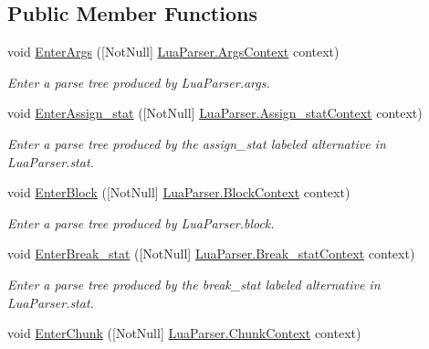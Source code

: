 \subsection*{Public Member Functions}
\begin{DoxyCompactItemize}
\item 
void \mbox{\hyperlink{classzlua_1_1_compiler_a60ee0650123807779b316af7cf7b213d}{Enter\+Args}} (\mbox{[}Not\+Null\mbox{]} \mbox{\hyperlink{classzlua_1_1_lua_parser_1_1_args_context}{Lua\+Parser.\+Args\+Context}} context)
\begin{DoxyCompactList}\small\item\em Enter a parse tree produced by Lua\+Parser.\+args. \end{DoxyCompactList}\item 
void \mbox{\hyperlink{classzlua_1_1_compiler_aaffd1a513f64fae2076a896a889e00bf}{Enter\+Assign\+\_\+stat}} (\mbox{[}Not\+Null\mbox{]} \mbox{\hyperlink{classzlua_1_1_lua_parser_1_1_assign__stat_context}{Lua\+Parser.\+Assign\+\_\+stat\+Context}} context)
\begin{DoxyCompactList}\small\item\em Enter a parse tree produced by the {\ttfamily assign\+\_\+stat} labeled alternative in Lua\+Parser.\+stat. \end{DoxyCompactList}\item 
void \mbox{\hyperlink{classzlua_1_1_compiler_a3bb0ad1158b35844611b3bbb75ff5521}{Enter\+Block}} (\mbox{[}Not\+Null\mbox{]} \mbox{\hyperlink{classzlua_1_1_lua_parser_1_1_block_context}{Lua\+Parser.\+Block\+Context}} context)
\begin{DoxyCompactList}\small\item\em Enter a parse tree produced by Lua\+Parser.\+block. \end{DoxyCompactList}\item 
void \mbox{\hyperlink{classzlua_1_1_compiler_afb51cc611219670d5372b0d22f1026a3}{Enter\+Break\+\_\+stat}} (\mbox{[}Not\+Null\mbox{]} \mbox{\hyperlink{classzlua_1_1_lua_parser_1_1_break__stat_context}{Lua\+Parser.\+Break\+\_\+stat\+Context}} context)
\begin{DoxyCompactList}\small\item\em Enter a parse tree produced by the {\ttfamily break\+\_\+stat} labeled alternative in Lua\+Parser.\+stat. \end{DoxyCompactList}\item 
void \mbox{\hyperlink{classzlua_1_1_compiler_ac52a396b2bba3e5b8767672a72593d79}{Enter\+Chunk}} (\mbox{[}Not\+Null\mbox{]} \mbox{\hyperlink{classzlua_1_1_lua_parser_1_1_chunk_context}{Lua\+Parser.\+Chunk\+Context}} context)

\end{DoxyCompactItemize}
